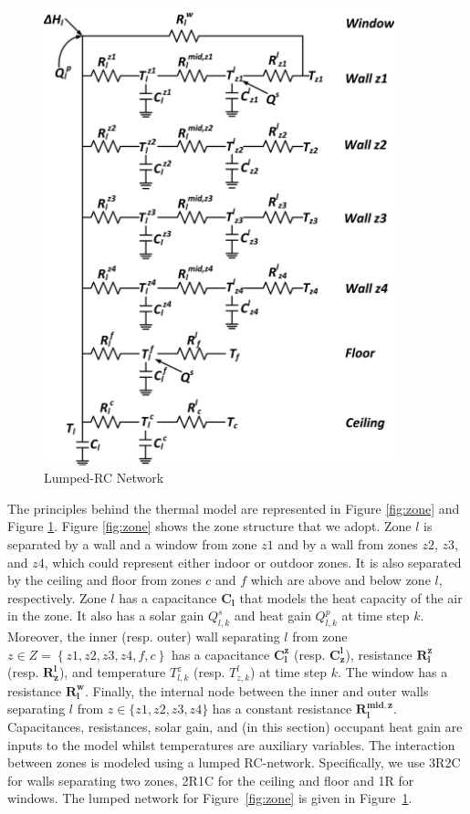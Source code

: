\begin{figure}[t]
\centering
	\includegraphics[width=4.0in,keepaspectratio]{./figs/3r2c.jpg}
\caption{Lumped-RC Network}
\label{fig:network}
\end{figure}

The principles behind the thermal model are represented in Figure \ref{fig:zone} and Figure \ref{fig:network}. Figure \ref{fig:zone} shows the zone structure that we adopt. Zone $l$ is separated by a wall and a window from zone $z1$ and by a wall from zones $z2$, $z3$, and $z4$, which could represent either indoor or outdoor zones. It is also separated by the ceiling and floor from zones $c$ and $f$ which are above and below zone $l$, respectively. Zone $l$ has a capacitance $\bm{C_l}$ that models the heat capacity of the air in the zone.  It also has a solar gain $Q^{s}_{l,k}$ and heat gain $Q^{p}_{l,k}$ at time step $k$. Moreover, the inner (resp. outer) wall separating $l$ from zone $z\in Z= \left\{z1,z2,z3,z4,f,c\right\}$ has a capacitance $\bm{C^z_l}$ (resp. $\bm{C^l_z}$), resistance $\bm{R^z_l}$ (resp. $\bm{R^l_z}$), and temperature $T^z_{l,k}$ (resp. $T^l_{z,k}$) at time step $k$. The window has a resistance $\bm{R^w_l}$. Finally, the internal node between the inner and outer walls separating $l$ from $z\in\{z1,z2,z3,z4\}$ has a constant resistance $\bm{R^{mid,z}_l}$. Capacitances, resistances, solar gain, and (in this section) occupant heat gain are inputs to the model whilst temperatures are auxiliary variables. The interaction between zones is modeled using a lumped RC-network. Specifically, we use 3R2C for walls separating two zones, 2R1C for the ceiling and floor and 1R for windows. The lumped network for Figure~\ref{fig:zone} is given in Figure~\ref{fig:network}.

